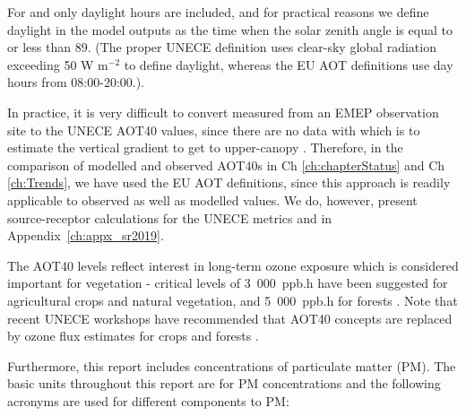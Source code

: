 \begin{description}
For \aotucf and \aotucc only daylight hours are included, and for practical
reasons we define daylight in the  model outputs as the time when the
solar zenith angle is equal to or less than 89\degrees. (The proper
UNECE definition uses clear-sky global radiation exceeding 50 W
m$^{-2}$ to define daylight, whereas the EU AOT definitions use day
hours from 08:00-20:00.).

In practice, it is very difficult to convert measured  from an EMEP observation site to the UNECE AOT40 values, since there are no data with which is to estimate the vertical gradient to get to upper-canopy . Therefore, in the comparison of modelled and observed AOT40s in Ch \ref{ch:chapterStatus} and Ch \ref{ch:Trends}, we have used the EU AOT definitions, since this approach is readily applicable to observed as well as modelled values. We do, however, present source-receptor calculations for the UNECE metrics \aotucf and \aotucc in Appendix~\ref{ch:appx_sr2019}.

The AOT40 levels reflect interest in long-term ozone exposure which is
considered important for vegetation - critical levels of 3~000~ppb.h
have been suggested for agricultural crops and natural vegetation, and
5~000~ppb.h for forests \cite[]{MappingManual:Veg}.
Note that recent  UNECE workshops have recommended that AOT40 concepts
are replaced by ozone flux estimates for crops and forests
\citep[see also][]{ICP2017}.
\end{description}



Furthermore, this report includes concentrations of particulate matter (PM). The basic units throughout this report
are \ug for PM concentrations and the following acronyms are used for different components to PM:

